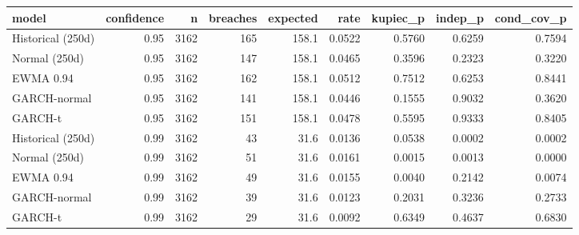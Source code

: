 
\begin{tabular}{lrrrrrrrr}
\toprule
model & confidence & n & breaches & expected & rate & kupiec\_p & indep\_p & cond\_cov\_p\\
\midrule
Historical (250d) & 0.95 & 3162 & 165 & 158.1 & 0.0522 & 0.5760 & 0.6259 & 0.7594\\
Normal (250d) & 0.95 & 3162 & 147 & 158.1 & 0.0465 & 0.3596 & 0.2323 & 0.3220\\
EWMA 0.94 & 0.95 & 3162 & 162 & 158.1 & 0.0512 & 0.7512 & 0.6253 & 0.8441\\
GARCH-normal & 0.95 & 3162 & 141 & 158.1 & 0.0446 & 0.1555 & 0.9032 & 0.3620\\
GARCH-t & 0.95 & 3162 & 151 & 158.1 & 0.0478 & 0.5595 & 0.9333 & 0.8405\\
\addlinespace
Historical (250d) & 0.99 & 3162 & 43 & 31.6 & 0.0136 & 0.0538 & 0.0002 & 0.0002\\
Normal (250d) & 0.99 & 3162 & 51 & 31.6 & 0.0161 & 0.0015 & 0.0013 & 0.0000\\
EWMA 0.94 & 0.99 & 3162 & 49 & 31.6 & 0.0155 & 0.0040 & 0.2142 & 0.0074\\
GARCH-normal & 0.99 & 3162 & 39 & 31.6 & 0.0123 & 0.2031 & 0.3236 & 0.2733\\
GARCH-t & 0.99 & 3162 & 29 & 31.6 & 0.0092 & 0.6349 & 0.4637 & 0.6830\\
\bottomrule
\end{tabular}
